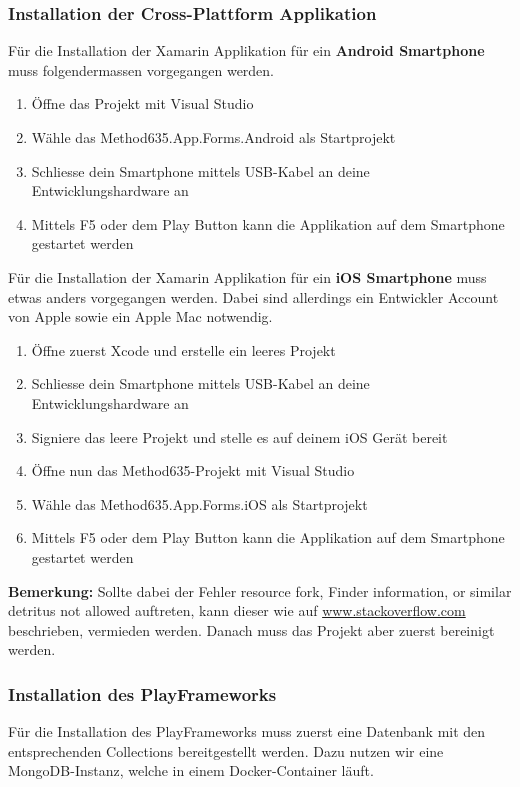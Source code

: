 \subsubsection*{Installation der Cross-Plattform Applikation}
\label{subsub:installation}
Für die Installation der Xamarin Applikation für ein \textbf{Android Smartphone} muss folgendermassen vorgegangen werden.

\begin{enumerate}
  \item Öffne das Projekt mit Visual Studio
  \item Wähle das \grqq Method635.App.Forms.Android \grqq als Startprojekt
  \item Schliesse dein Smartphone mittels USB-Kabel an deine Entwicklungshardware an
  \item Mittels F5 oder dem Play Button kann die Applikation auf dem Smartphone gestartet werden
\end{enumerate}
Für die Installation der Xamarin Applikation für ein \textbf{iOS Smartphone} muss etwas anders vorgegangen werden. Dabei sind allerdings ein Entwickler Account von Apple sowie ein Apple Mac notwendig.

\begin{enumerate}
  \item Öffne zuerst Xcode und erstelle ein leeres Projekt
  \item Schliesse dein Smartphone mittels USB-Kabel an deine Entwicklungshardware an
  \item Signiere das leere Projekt und stelle es auf deinem iOS Gerät bereit
  \item Öffne nun das Method635-Projekt mit Visual Studio
  \item Wähle das \grqq Method635.App.Forms.iOS \grqq als Startprojekt
  \item Mittels F5 oder dem Play Button kann die Applikation auf dem Smartphone gestartet werden
\end{enumerate}
\textbf{Bemerkung:} Sollte dabei der Fehler \grqq resource fork, Finder information, or similar detritus not allowed\grqq{} auftreten, kann dieser wie auf \href{https://stackoverflow.com/questions/39652867/code-sign-error-in-macos-high-sierra-xcode-resource-fork-finder-information}{www.stackoverflow.com} beschrieben, vermieden werden. Danach muss das Projekt aber zuerst bereinigt werden.


\subsubsection*{Installation des PlayFrameworks}
Für die Installation des PlayFrameworks muss zuerst eine Datenbank mit den entsprechenden Collections bereitgestellt werden. Dazu nutzen wir eine MongoDB-Instanz, welche in einem Docker-Container läuft.

